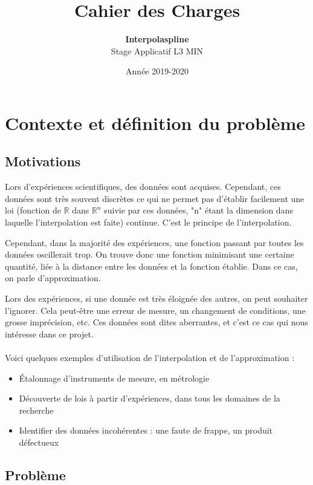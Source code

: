 \documentclass[a4paper,12pt]{article}
\title{Cahier des Charges}
\author{\textbf{Interpolaspline}\\Stage Applicatif L3 MIN}
\date{Année 2019-2020}
\newcommand{\IKex}[2]{\mathbb{#1}^{#2}}
\newcommand{\IK}[1]{\mathbb{#1}}
\newcommand{\IRex}[1]{\IKex{R}{#1}}
\newcommand{\IR}{\IK{R}}
\begin{document}
\maketitle
\tableofcontents

\newpage

\section{Contexte et définition du problème}

\subsection{Motivations}

Lors d'expériences scientifiques, des données sont acquises. Cependant, ces données sont très souvent discrètes ce qui ne permet pas d'établir facilement une loi (fonction de $\IR$ dans $\IRex{n}$ suivie par ces données, "n" étant la dimension dans laquelle l'interpolation est faite) continue. C'est le principe de l'interpolation.

Cependant, dans la majorité des expériences, une fonction passant par toutes les données oscillerait trop. On trouve donc une fonction minimisant une certaine quantité, liée à la distance entre les données et la fonction établie. Dans ce cas, on parle d'approximation.

Lors des expériences, si une donnée est très éloignée des autres, on peut souhaiter l'ignorer. Cela peut-être une erreur de mesure, un changement de conditions, une grosse imprécision, etc. Ces données sont dites aberrantes, et c'est ce cas qui nous intéresse dans ce projet.
\\ \\
Voici quelques exemples d'utilisation de l'interpolation et de l'approximation :
\begin{itemize}
\item Étalonnage d'instruments de mesure, en métrologie
\item Découverte de lois à partir d'expériences, dans tous les domaines de la recherche
\item Identifier des données incohérentes : une faute de frappe, un produit défectueux
\end{itemize}


\subsection{Problème}
\end{document}
